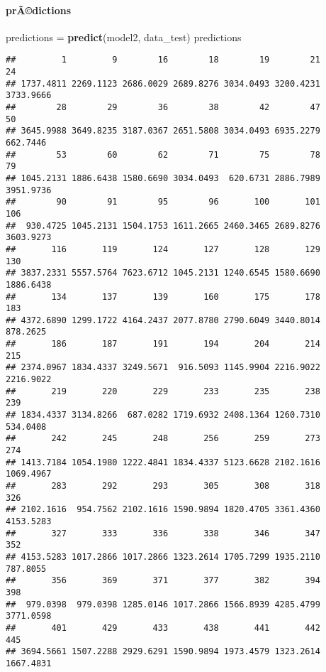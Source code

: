 \documentclass[]{article}
\newenvironment{Shaded}{\begin{snugshade}}{\end{snugshade}}
\newcommand{\KeywordTok}[1]{\textcolor[rgb]{0.13,0.29,0.53}{\textbf{#1}}}
\newcommand{\StringTok}[1]{\textcolor[rgb]{0.31,0.60,0.02}{#1}}
\newcommand{\NormalTok}[1]{#1}
\let\oldparagraph\paragraph
\renewcommand{\paragraph}[1]{\oldparagraph{#1}\mbox{}}
\begin{document}
\paragraph{prÃ©dictions}\label{pradictions-1}

\begin{Shaded}
\begin{Highlighting}[]
\NormalTok{predictions =}\StringTok{ }\KeywordTok{predict}\NormalTok{(model2, data_test)}
\NormalTok{predictions}
\end{Highlighting}
\end{Shaded}

\begin{verbatim}
##         1         9        16        18        19        21        24 
## 1737.4811 2269.1123 2686.0029 2689.8276 3034.0493 3200.4231 3733.9666 
##        28        29        36        38        42        47        50 
## 3645.9988 3649.8235 3187.0367 2651.5808 3034.0493 6935.2279  662.7446 
##        53        60        62        71        75        78        79 
## 1045.2131 1886.6438 1580.6690 3034.0493  620.6731 2886.7989 3951.9736 
##        90        91        95        96       100       101       106 
##  930.4725 1045.2131 1504.1753 1611.2665 2460.3465 2689.8276 3603.9273 
##       116       119       124       127       128       129       130 
## 3837.2331 5557.5764 7623.6712 1045.2131 1240.6545 1580.6690 1886.6438 
##       134       137       139       160       175       178       183 
## 4372.6890 1299.1722 4164.2437 2077.8780 2790.6049 3440.8014  878.2625 
##       186       187       191       194       204       214       215 
## 2374.0967 1834.4337 3249.5671  916.5093 1145.9904 2216.9022 2216.9022 
##       219       220       229       233       235       238       239 
## 1834.4337 3134.8266  687.0282 1719.6932 2408.1364 1260.7310  534.0408 
##       242       245       248       256       259       273       274 
## 1413.7184 1054.1980 1222.4841 1834.4337 5123.6628 2102.1616 1069.4967 
##       283       292       293       305       308       318       326 
## 2102.1616  954.7562 2102.1616 1590.9894 1820.4705 3361.4360 4153.5283 
##       327       333       336       338       346       347       352 
## 4153.5283 1017.2866 1017.2866 1323.2614 1705.7299 1935.2110  787.8055 
##       356       369       371       377       382       394       398 
##  979.0398  979.0398 1285.0146 1017.2866 1566.8939 4285.4799 3771.0598 
##       401       429       433       438       441       442       445 
## 3694.5661 1507.2288 2929.6291 1590.9894 1973.4579 1323.2614 1667.4831 

\end{verbatim}
\end{document}
